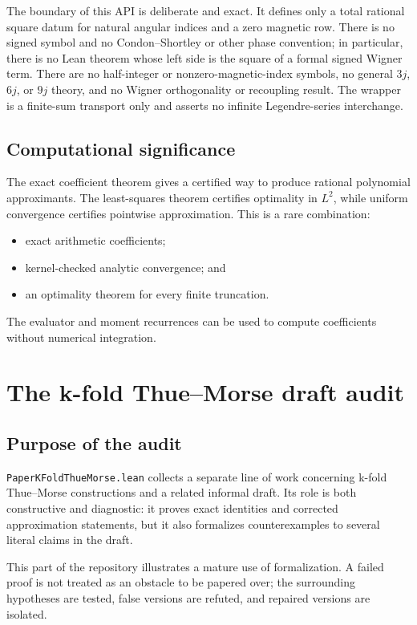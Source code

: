 \documentclass[11pt,oneside]{article}
\theoremstyle{definition}
\theoremstyle{remark}
\begin{document}
The boundary of this API is deliberate and exact.  It defines only a total rational
square datum for natural angular indices and a zero magnetic row.  There is no signed
symbol and no Condon--Shortley or other phase convention; in particular, there is no Lean
theorem whose left side is the square of a formal signed Wigner term.  There are no
half-integer or nonzero-magnetic-index symbols, no general \(3j\), \(6j\), or \(9j\)
theory, and no Wigner orthogonality or recoupling result.  The wrapper is a finite-sum
transport only and asserts no infinite Legendre-series interchange.

\subsection{Computational significance}
The exact coefficient theorem gives a certified way to produce rational polynomial approximants.  The least-squares theorem certifies optimality in \(L^2\), while uniform convergence certifies pointwise approximation.  This is a rare combination:
\begin{itemize}
  \item exact arithmetic coefficients;
  \item kernel-checked analytic convergence; and
  \item an optimality theorem for every finite truncation.
\end{itemize}
The evaluator and moment recurrences can be used to compute coefficients without numerical integration.

\section{The k-fold Thue--Morse draft audit}\label{ch:kfold}

\subsection{Purpose of the audit}
\nolinkurl{PaperKFoldThueMorse.lean} collects a separate line of work concerning k-fold Thue--Morse constructions and a related informal draft.  Its role is both constructive and diagnostic: it proves exact identities and corrected approximation statements, but it also formalizes counterexamples to several literal claims in the draft.

This part of the repository illustrates a mature use of formalization.  A failed proof is not treated as an obstacle to be papered over; the surrounding hypotheses are tested, false versions are refuted, and repaired versions are isolated.
\end{document}
